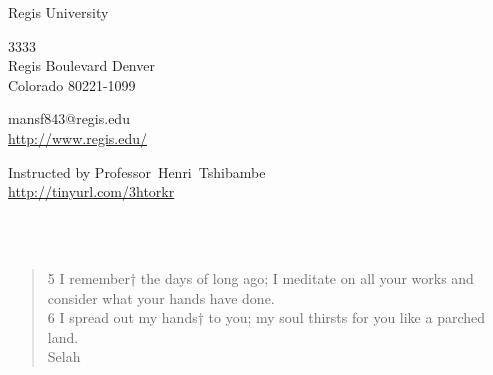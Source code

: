 \documentclass[11pt,a4paper]{scrartcl} %
\begin{document}
\pagecolor{Sepia!20}
\begin{cv}{}
        \begin{cvlist}{\textcolor{brown}{}}\label{PersDat}  
            \item   Regis University
            \item   3333\\
                    Regis Boulevard Denver \\	
                    Colorado 80221-1099
            \item   mansf843@regis.edu\\				
                    \url{http://www.regis.edu/}				
        \end{cvlist}
        \begin{cvlist}{}\label{irgendwas}
            \item Instructed by Professor~Henri~Tshibambe\\
             \url{http://tinyurl.com/3htorkr}
        \end{cvlist}
    \end{cv}
\clearpage
\noindent
\begin{center}
\textcolor{Maroon}{}\\
\textcolor{Maroon}{}\\
\begin{verse}
5 I remember† the days of long ago; I meditate on all your works and consider what your hands have done. \\
6 I spread out my hands† to you; my soul thirsts for you like a parched land.\\ 
Selah 
\end{verse}
\end{center}

\clearpage
\title{\textcolor{Maroon}{\rmfamily\normalfont{}}}
    \author{\textcolor{brown}{}}
    \date{} %
    
    \maketitle
    
 \begin{abstract}

 \end{abstract}
       
\end{document}
